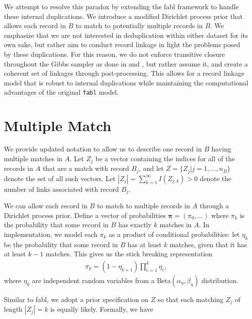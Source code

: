 \documentclass[12pt,letterpaper]{article}
\newcommand{\1}[1]{\mathbb{I}\!\left[#1\right]} %
\begin{document}
We attempt to resolve this paradox by extending the fabl framework to handle these internal duplications. We introduce a modified Dirichlet process prior that allows each record in $B$ to match to potentially multiple records in $B$. We emphasize that we are not interested in deduplication within either dataset for its own sake, but rather aim to conduct record linkage in light the problems posed by these duplications. For this reason, we do not enforce transitive closure throughout the Gibbs sampler as done in \cite{marchant_distributed_2019} and \cite{aleshinguendel2021multifile}, but rather assume it, and create a coherent set of linkages through post-processing. This allows for a record linkage model that is robust to internal duplications while maintaining the computational advantages of the original \texttt{fabl} model. 

\section{Multiple Match}

We provide updated notation to allow us to describe one record in $B$ having multiple matches in $A$. Let $Z_j$ be a vector containing the indices for all of the records in $A$ that are a match with record $B_j$, and let $Z = \{Z_j | j = 1, \ldots, n_B\}$ denote the set of all such vectors. Let $|Z_j| = \sum_{k=1}^{\infty} I(Z_{j, k}) > 0$ denote the number of links associated with record $B_j$. 

We can allow each record in $B$ to match to multiple records in $A$ through a Dirichlet process prior. Define a vector of probabilities $\bm{\pi} = (\pi_0, \ldots)$ where $\pi_k$ is the probability that some record in $B$ has exactly $k$ matches in $A$. In implementation, we model each $\pi_k$ as a product of conditional probabilities: let $\eta_k$ be the probability that some record in $B$ has at least $k$ matches, given that it has at least $k-1$ matches. This gives us the stick breaking representation
\begin{align}
	\pi_k = (1 - \eta_{k+1}) \prod_{c=1}^{k} \eta_c, 
\end{align}
where $\eta_k$ are independent random variables from a $\text{Beta}(\alpha_{\eta}, \beta_{\eta})$ distribution.

Similar to fabl, we adopt a prior specification on $Z$ so that each matching $Z_j$ of length $|Z_j| = k$ is equally likely. Formally, we have
\end{document}
